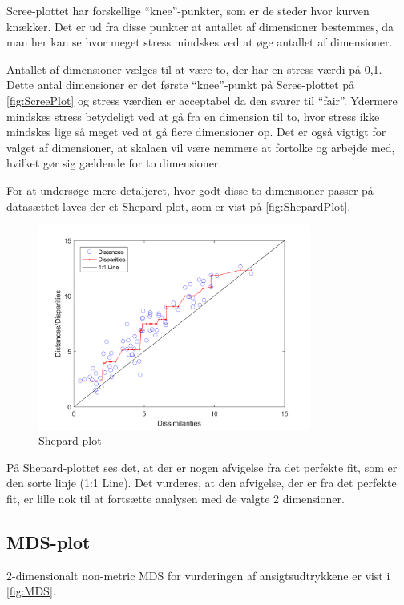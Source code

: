 \noindent Scree-plottet har forskellige ``knee''-punkter, som er de steder hvor kurven knækker. Det er ud fra disse punkter at antallet af dimensioner bestemmes, da man her kan se hvor meget stress mindskes ved at øge antallet af dimensioner. 

\noindent Antallet af dimensioner vælges til at være to, der har en stress værdi på 0,1. Dette antal dimensioner er det første ``knee''-punkt på Scree-plottet på \autoref{fig:ScreePlot} og stress værdien er acceptabel da den svarer til ``fair''. Ydermere mindskes stress betydeligt ved at gå fra en dimension til to, hvor stress ikke mindskes lige så meget ved at gå flere dimensioner op. Det er også vigtigt for valget af dimensioner, at skalaen vil være nemmere at fortolke og arbejde med, hvilket gør sig gældende for to dimensioner.

For at undersøge mere detaljeret, hvor godt disse to dimensioner passer på datasættet laves der et Shepard-plot, som er vist på \autoref{fig:ShepardPlot}.

\begin{figure}[H]
\centering
\includegraphics[width = 0.8\textwidth]{Figure/Sheppard_plot.png} 
\caption{Shepard-plot}
\label{fig:ShepardPlot}
\end{figure}

\noindent På Shepard-plottet ses det, at der er nogen afvigelse fra det perfekte fit, som er den sorte linje (1:1 Line). Det vurderes, at den afvigelse, der er fra det perfekte fit, er lille nok til at fortsætte analysen med de valgte 2 dimensioner. 

\subsection*{MDS-plot}
2-dimensionalt non-metric MDS for vurderingen af ansigtsudtrykkene er vist i \autoref{fig:MDS}.  

